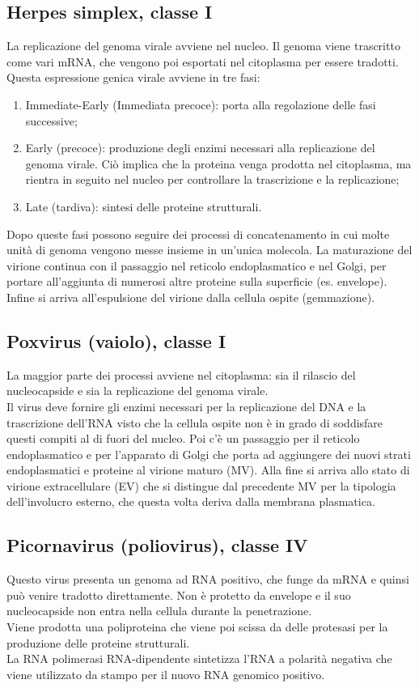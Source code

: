 \subsection{Herpes simplex, classe I}
La replicazione del genoma virale avviene nel nucleo. Il genoma viene trascritto come vari mRNA, che vengono poi esportati nel citoplasma per essere tradotti. Questa espressione genica virale avviene in tre fasi: 
\begin{enumerate}
    \item Immediate-Early (Immediata precoce): porta alla regolazione delle fasi successive; 
    \item Early (precoce): produzione degli enzimi necessari alla replicazione del genoma virale. Ci\`o implica che la proteina venga prodotta nel citoplasma, ma rientra in seguito nel nucleo per controllare la trascrizione e la replicazione;
    \item Late (tardiva): sintesi delle proteine strutturali.
\end{enumerate}
Dopo queste fasi possono seguire dei processi di concatenamento in cui molte unit\`a di genoma vengono messe insieme in un'unica molecola. La maturazione del virione continua con il passaggio nel reticolo endoplasmatico e nel Golgi, per portare all'aggiunta di numerosi altre proteine sulla superficie (es. envelope). Infine si arriva all'espulsione del virione dalla cellula ospite (gemmazione).
\subsection{Poxvirus (vaiolo), classe I}
La maggior parte dei processi avviene nel citoplasma: sia il rilascio del nucleocapside e sia la replicazione del genoma virale. 
\\Il virus deve fornire gli enzimi necessari per la replicazione del DNA e la trascrizione dell'RNA visto che la cellula ospite non \`e in grado di soddisfare questi compiti al di fuori del nucleo. Poi c'\`e un passaggio per il reticolo endoplasmatico e per l'apparato di Golgi che porta ad aggiungere dei nuovi strati endoplasmatici e proteine al virione maturo (MV). Alla fine si arriva allo stato di virione extracellulare (EV) che si distingue dal precedente MV per la tipologia dell'involucro esterno, che questa volta deriva dalla membrana plasmatica.
\subsection{Picornavirus (poliovirus), classe IV}
Questo virus presenta un genoma ad RNA positivo, che funge da mRNA e quinsi pu\`o venire tradotto direttamente. Non \`e protetto da envelope e il suo nucleocapside non entra nella cellula durante la penetrazione.
\\Viene prodotta una poliproteina che viene poi scissa da delle protesasi per la produzione delle proteine strutturali. 
\\La RNA polimerasi RNA-dipendente sintetizza l'RNA a polarit\`a negativa che viene utilizzato da stampo per il nuovo RNA genomico positivo. 
